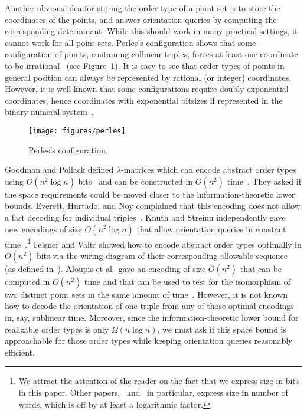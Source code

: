 Another obvious idea for storing the order type of a point set is to store
the coordinates of the points, and answer orientation queries
by computing the corresponding determinant. While this should work in many practical
settings, it cannot work for all point sets. Perles's configuration shows that
some configuration of points, containing collinear triples, forces at least one
coordinate to be irrational~\cite{Gr05}\ifeurocg\else%
(see Figure~\ref{fig:perles})\fi.
%
It is easy to see that
order types of points in general position can always be represented by rational
(or integer) coordinates.
%
However, it is well known that some configurations require doubly
exponential coordinates, hence coordinates with exponential bitsizes if
represented in the binary numeral system~\cite{GPS89}.

\ifeurocg\else%
\begin{figure}
	\centering{}
	\texttt{[image: figures/perles]}
	\caption{Perles's configuration.}\label{fig:perles}
\end{figure}
\fi%

Goodman and Pollack defined \(\lambda\)-matrices which can encode abstract order
types using \( O(n^2 \log{n}) \) bits~\cite{GP83} and can be constructed in
\(O(n^2)\) time~\cite{EOS86}. They asked if the space
requirements could be moved closer to the information-theoretic lower bounds.
Everett, Hurtado, and Noy complained that this encoding does not
allow a fast decoding for individual triples~\cite{EHN99}.
Knuth and Streinu independently gave new encodings of size \(O(n^2 \log n)\)
that allow orientation queries in constant time~\cite{Knu92,St97}.\footnote{%
We attract the attention of the reader on the fact that we express size in bits
in this paper. Other papers,~\cite{EHN99} and~\cite{St97} in particular,
express size in number of words, which is off by at least a logarithmic factor.}
Felsner and Valtr showed how to encode abstract order types optimally in
\(O(n^2)\) bits via the wiring diagram of their corresponding allowable
sequence~\cite{Fe96, FV11} (as defined in~\cite{Go80}). Aloupis et al.\ gave
an encoding of size \(O(n^2)\) that can be computed in \(O(n^2)\) time and that
can be used to test for the isomorphism of two distinct point sets in the same
amount of time~\cite{AILOW14}. However, it is not known how to decode the
orientation of one triple from any of those optimal encodings in, say, sublinear time.
Moreover, since the information-theoretic lower bound for realizable order
types is only \(\Omega(n \log{n})\), we must ask if this space bound is
approachable for those order types while keeping orientation queries reasonably
efficient.
